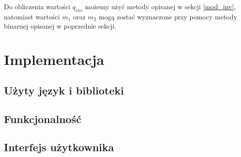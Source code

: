 \documentclass[10pt,a4paper]{article}
\begin{document}
Do obliczenia wartości $q_{inv}$ możemy użyć metody opisanej w sekcji \ref{mod_inv}, natomiast wartości $m_1$ oraz $m_2$ mogą zostać wyznaczone przy pomocy metody binarnej opisanej w poprzednie sekcji.

\section{Implementacja}
\subsection{Użyty język i biblioteki}
\subsection{Funkcjonalność}
\subsection{Interfejs użytkownika}


	
\end{document}
